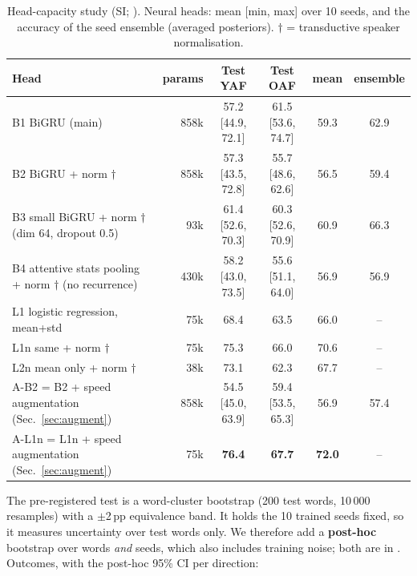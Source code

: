 \begin{table}[H]\centering\small
\caption[Study 2: head capacity]{Head-capacity study (SI; ). Neural heads: mean [min, max] over 10 seeds, and the accuracy of the seed ensemble (averaged posteriors). $\dagger$ = transductive speaker normalisation.}\label{tab:capacity}
\begin{tabular}{@{}lrcccc@{}}\toprule
Head & params & Test YAF & Test OAF & mean & ensemble\\\midrule
B1 BiGRU (main) & 858k & 57.2 [44.9, 72.1] & 61.5 [53.6, 74.7] & 59.3 & 62.9\\
B2 BiGRU + norm $\dagger$ & 858k & 57.3 [43.5, 72.8] & 55.7 [48.6, 62.6] & 56.5 & 59.4\\
B3 small BiGRU + norm $\dagger$ (dim 64, dropout 0.5) & 93k & 61.4 [52.6, 70.3] & 60.3 [52.6, 70.9] & 60.9 & 66.3\\
B4 attentive stats pooling + norm $\dagger$ (no recurrence) & 430k & 58.2 [43.0, 73.5] & 55.6 [51.1, 64.0] & 56.9 & 56.9\\\midrule
L1 logistic regression, mean+std & 75k & 68.4 & 63.5 & 66.0 & --\\
L1n same + norm $\dagger$ & 75k & 75.3 & 66.0 & 70.6 & --\\
L2n mean only + norm $\dagger$ & 38k & 73.1 & 62.3 & 67.7 & --\\\midrule
A-B2 = B2 + speed augmentation (Sec.~\ref{sec:augment}) & 858k & 54.5 [45.0, 63.9] & 59.4 [53.5, 65.3] & 56.9 & 57.4\\
A-L1n = L1n + speed augmentation (Sec.~\ref{sec:augment}) & 75k & \textbf{76.4} & \textbf{67.7} & \textbf{72.0} & --\\\bottomrule
\end{tabular}\end{table}
The pre-registered test is a word-cluster bootstrap (200 test words, 10\,000 resamples) with a $\pm$2\,pp equivalence band. It holds the 10 trained seeds fixed, so it measures uncertainty over test words only.
We therefore add a \textbf{post-hoc} bootstrap over words \emph{and} seeds, which also includes training noise; both are in . Outcomes, with the post-hoc 95\% CI per direction:
